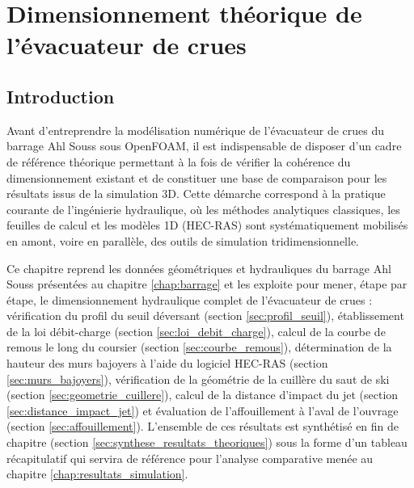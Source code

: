 \chapter{Dimensionnement théorique de l'évacuateur de crues}
\label{chap:dimensionnement_theorique}

\section{Introduction}
\label{sec:intro_dimensionnement}

Avant d'entreprendre la modélisation numérique de l'évacuateur de crues du barrage Ahl Souss sous OpenFOAM, il est indispensable de disposer d'un cadre de référence théorique permettant à la fois de vérifier la cohérence du dimensionnement existant et de constituer une base de comparaison pour les résultats issus de la simulation 3D. Cette démarche correspond à la pratique courante de l'ingénierie hydraulique, où les méthodes analytiques classiques, les feuilles de calcul et les modèles 1D (HEC-RAS) sont systématiquement mobilisés en amont, voire en parallèle, des outils de simulation tridimensionnelle.

Ce chapitre reprend les données géométriques et hydrauliques du barrage Ahl Souss présentées au chapitre \ref{chap:barrage} et les exploite pour mener, étape par étape, le dimensionnement hydraulique complet de l'évacuateur de crues : vérification du profil du seuil déversant (section \ref{sec:profil_seuil}), établissement de la loi débit-charge (section \ref{sec:loi_debit_charge}), calcul de la courbe de remous le long du coursier (section \ref{sec:courbe_remous}), détermination de la hauteur des murs bajoyers à l'aide du logiciel HEC-RAS (section \ref{sec:murs_bajoyers}), vérification de la géométrie de la cuillère du saut de ski (section \ref{sec:geometrie_cuillere}), calcul de la distance d'impact du jet (section \ref{sec:distance_impact_jet}) et évaluation de l'affouillement à l'aval de l'ouvrage (section \ref{sec:affouillement}). L'ensemble de ces résultats est synthétisé en fin de chapitre (section \ref{sec:synthese_resultats_theoriques}) sous la forme d'un tableau récapitulatif qui servira de référence pour l'analyse comparative menée au chapitre \ref{chap:resultats_simulation}.


